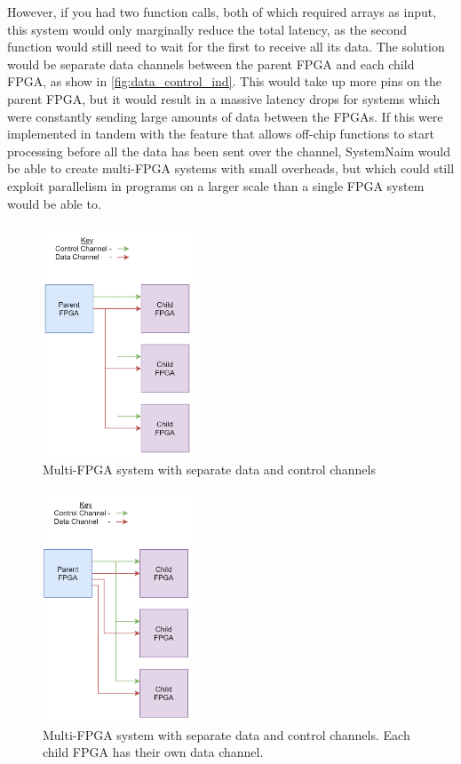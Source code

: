 However, if you had two function calls, both of which required arrays as input, this system would only marginally reduce the total latency, as the second function would still need to wait for the first to receive all its data. The solution would be separate data channels between the parent FPGA and each child FPGA, as show in \autoref{fig:data_control_ind}. This would take up more pins on the parent FPGA, but it would result in a massive latency drops for systems which were constantly sending large amounts of data between the FPGAs. If this were implemented in tandem with the feature that allows off-chip functions to start processing before all the data has been sent over the channel, SystemNaim would be able to create multi-FPGA systems with small overheads, but which could still exploit parallelism in programs on a larger scale than a single FPGA system would be able to.

\begin{figure}[!htb]
    \centering
    \includegraphics[width=0.4\textwidth]{06_future_work/images/data_control_channels.png}
    \caption{Multi-FPGA system with separate data and control channels}
    \label{fig:data_control}
\end{figure}

\begin{figure}[!htb]
    \centering
    \includegraphics[width=0.4\textwidth]{06_future_work/images/data_control_channels_independent.png}
    \caption{Multi-FPGA system with separate data and control channels. Each child FPGA has their own data channel.}
    \label{fig:data_control_ind}
\end{figure}

